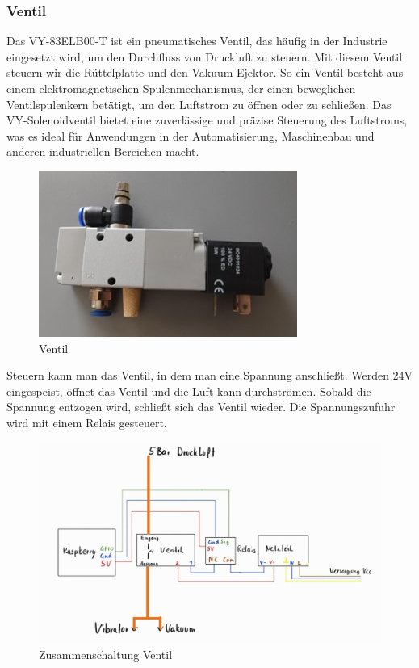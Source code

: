 \subsubsection{Ventil}
Das VY-83ELB00-T\autocite{Ventil} ist ein pneumatisches Ventil, das häufig in der Industrie eingesetzt wird, um den Durchfluss von Druckluft zu steuern. Mit diesem Ventil steuern wir die Rüttelplatte und den Vakuum Ejektor. So ein Ventil besteht aus einem elektromagnetischen Spulenmechanismus, der einen beweglichen Ventilspulenkern betätigt, um den Luftstrom zu öffnen oder zu schließen. Das VY-Solenoidventil bietet eine zuverlässige und präzise Steuerung des Luftstroms, was es ideal für Anwendungen in der Automatisierung, Maschinenbau und anderen industriellen Bereichen macht.\\
\vspace{3mm}
\begin{figure}[H]
    \centering
    \includegraphics{image/ventil.jpeg}
    \caption{Ventil}
    \label{fig:enter-label}
\end{figure}
\vspace{3mm}
Steuern kann man das Ventil, in dem man eine Spannung anschließt. Werden 24V eingespeist, öffnet das Ventil und die Luft kann durchströmen. Sobald die Spannung entzogen wird, schließt sich das Ventil wieder. Die Spannungszufuhr wird mit einem Relais gesteuert.
\begin{figure}[H]
    \centering
    \includegraphics[scale=0.3]{image/zusammenschaltngventil.jpeg}
    \caption{Zusammenschaltung Ventil}
    \label{fig:enter-label}
\end{figure}

